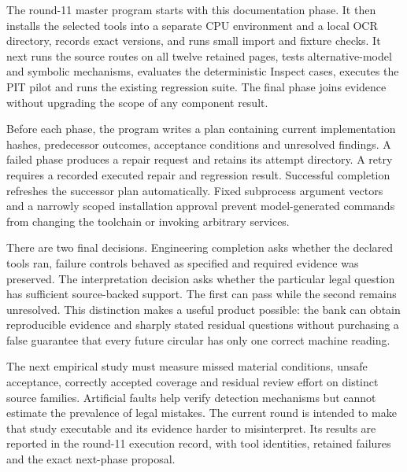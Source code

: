 The round-11 master program starts with this documentation phase. It then installs
the selected tools into a separate CPU environment and a local OCR directory,
records exact versions, and runs small import and fixture checks. It next runs
the source routes on all twelve retained pages, tests alternative-model and
symbolic mechanisms, evaluates the deterministic Inspect cases, executes the
PIT pilot and runs the existing regression suite. The final phase joins evidence
without upgrading the scope of any component result.

Before each phase, the program writes a plan containing current implementation
hashes, predecessor outcomes, acceptance conditions and unresolved findings. A
failed phase produces a repair request and retains its attempt directory. A
retry requires a recorded executed repair and regression result. Successful
completion refreshes the successor plan automatically. Fixed subprocess argument
vectors and a narrowly scoped installation approval prevent model-generated
commands from changing the toolchain or invoking arbitrary services.

There are two final decisions. Engineering completion asks whether the declared
tools ran, failure controls behaved as specified and required evidence was
preserved. The interpretation decision asks whether the particular legal question
has sufficient source-backed support. The first can pass while the second remains
unresolved. This distinction makes a useful product possible: the bank can obtain
reproducible evidence and sharply stated residual questions without purchasing a
false guarantee that every future circular has only one correct machine reading.

The next empirical study must measure missed material conditions, unsafe
acceptance, correctly accepted coverage and residual review effort on distinct
source families. Artificial faults help verify detection mechanisms but cannot
estimate the prevalence of legal mistakes. The current round is intended to make
that study executable and its evidence harder to misinterpret. Its results are
reported in the round-11 execution record, with tool identities, retained failures
and the exact next-phase proposal.
